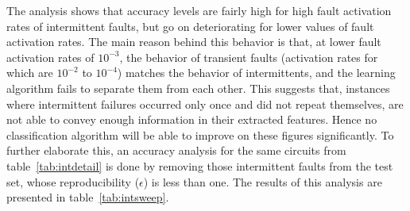 The analysis shows that accuracy levels are fairly high for high fault activation rates of intermittent faults, but go on deteriorating for lower values of fault activation rates. The main reason behind this behavior is that, at lower fault activation rates of $10^{-3}$, the behavior of transient faults (activation rates for which are $10^{-2}$ to $10^{-4}$) matches the behavior of intermittents, and the learning algorithm fails to separate them from each other. This suggests that, instances where intermittent failures occurred only once and did not repeat themselves, are not able to convey enough information in their extracted features. Hence no classification algorithm will be able to improve on these figures significantly. To further elaborate this, an accuracy analysis for the same circuits from table~\ref{tab:intdetail} is done by removing those intermittent faults from the test set, whose reproducibility ($\epsilon$) is less than one. The results of this analysis are presented in table~\ref{tab:intsweep}.


